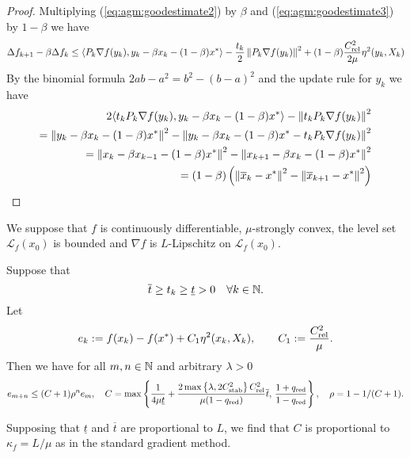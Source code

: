 \begin{proof}
Multiplying (\ref{eq:agm:goodestimate2}) by $\beta$ and (\ref{eq:agm:goodestimate3}) by $1-\beta$ we have
%
\begin{align*}
\Delta f_{k+1} - \beta \Delta f_{k} \le \langle P_k\nabla f(y_k),y_k-\beta x_k - (1-\beta) x^*\rangle- \frac{t_k}{2}\left\|P_{k}\nabla f(y_k)\right\|^2
+ (1-\beta)\frac{C_{\rm rel}^2}{2\mu}\eta^2(y_k,X_k)
\end{align*}
%
By the binomial formula $2ab - a^2 = b^2-(b-a)^2$ and the update rule for $y_k$ we have
%
\begin{align*}
2\langle t_kP_k\nabla f(y_k),y_k-\beta x_k - (1-\beta) x^*\rangle- \left\|t_k P_{k}\nabla f(y_k)\right\|^2\\
=
\left\|y_k-\beta x_k - (1-\beta) x^*\right\|^2 - \left\|y_k-\beta x_k - (1-\beta) x^* - t_k P_{k}\nabla f(y_k)\right\|^2\\
=\left\|x_k-\beta x_{k-1} - (1-\beta) x^*\right\|^2 - \left\|x_{k+1}-\beta x_k - (1-\beta) x^* \right\|^2\\
=(1-\beta)\left( \left\|\overline{x}_{k}-x^*\right\|^2 - \left\|\overline{x}_{k+1}-x^*\right\|^2\right)
\end{align*}
%
%
\end{proof}
%
%
\begin{theorem}\label{thm:}
We suppose that $f$ is continuously differentiable, $\mu$-strongly convex,
the level set $\mathcal L_f(x_0)$ is bounded and $\nabla f$ is $L$-Lipschitz on $\mathcal L_f(x_0)$.

Suppose that
%
\begin{equation}\label{eq:timestepcond}
\overline{t}\ge t_k \ge \underline{t}>0\quad\forall k\in\mathbb N.
\end{equation}
%
Let
%
\begin{equation}\label{eq:gm:errordef}
e_k := f(x_{k}) - f(x^*) + C_1 \eta^2(x_{k}, X_k),\qquad C_1 := \frac{C_{\rm rel}^2}{\mu}.
\end{equation}
%
Then we have for all $m,n\in\mathbb N$ and arbitrary $\lambda>0$
%
\begin{equation}\label{eq:gm:rconv}
e_{m+n} \le (C+1) \rho^n e_m,\quad C=\max\left\{\frac{1}{4\mu\underline{t}} +  \frac{2\max\left\{\lambda,2C_{\rm stab}^2\right\}C_{\rm rel}^2}{\mu(1-{q_{\rm red}})} \overline{t},\,\frac{1+q_{\rm red}}{1-q_{\rm red}}\right\},
\quad \rho = 1 - 1/(C+1).
\end{equation}
%
\end{theorem}
%
\begin{remark}\label{rmk:}
Supposing that $\underline{t}$ and $\overline{t}$ are proportional to $L$, we find that $C$ is proportional to $\kappa_f = L/\mu$ as in the standard gradient method.
\end{remark}
